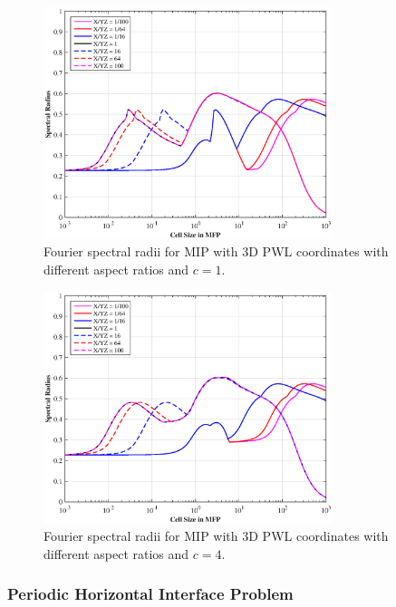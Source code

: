 \begin{figure}
\centering
\includegraphics[width=0.75\textwidth]{figures/sec_DSA/SI_MIP_hex_PWLD1_AR1.eps}
\caption{Fourier spectral radii for MIP with 3D PWL coordinates with different aspect ratios and $c=1$.}
\label{fig::DSA_1G_Fourier_PWL_AR1}
\end{figure}

\begin{figure}
\centering
\includegraphics[width=0.75\textwidth]{figures/sec_DSA/SI_MIP_hex_PWLD1_AR4.eps}
\caption{Fourier spectral radii for MIP with 3D PWL coordinates with different aspect ratios and $c=4$.}
\label{fig::DSA_1G_Fourier_PWL_AR4}
\end{figure}

\subsubsection{Periodic Horizontal Interface Problem}
\label{sec::DSA_Results_1G_PHI}

